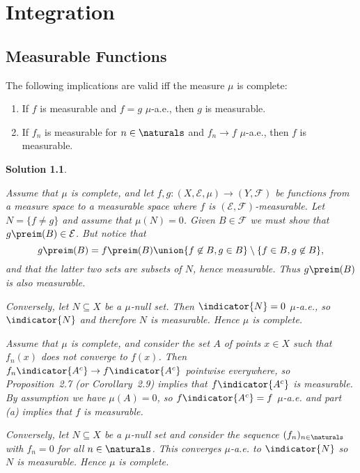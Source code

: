 \documentclass[article, a4paper, 11pt, oneside]{memoir}
\numberwithin{equation}{chapter}
\newcommand{\calE}{\mathcal{E}}
\newcommand{\calF}{\mathcal{F}}
\theoremstyle{nonumberplain}
\newtheorem{solution}{Solution}
\begin{document}
\chapter{Integration}

\section{Measurable Functions}

\begin{exerciseframed*}[10]
    The following implications are valid iff the measure $\mu$ is complete:
    \begin{enumerate}
        \item If $f$ is measurable and $f = g$ $\mu$-a.e., then $g$ is measurable.
        \item If $f_n$ is measurable for $n \in \naturals$ and $f_n \to f$ $\mu$-a.e., then $f$ is measurable.
    \end{enumerate}
\end{exerciseframed*}

\begin{solution}
\begin{solutionsec}
    \item Assume that $\mu$ is complete, and let $f,g \colon (X,\calE,\mu) \to (Y,\calF)$ be functions from a measure space to a measurable space where $f$ is $(\calE,\calF)$-measurable. Let $N = \{f \neq g\}$ and assume that $\mu(N) = 0$. Given $B \in \calF$ we must show that $g\preim(B) \in \calE$. But notice that
    \begin{equation*}
        g\preim(B)
            = f\preim(B) \union \{ f \not\in B, g \in B \} \setminus \{ f \in B, g \not\in B \},
    \end{equation*}
    and that the latter two sets are subsets of $N$, hence measurable. Thus $g\preim(B)$ is also measurable.


	Conversely, let $N \subseteq X$ be a $\mu$-null set. Then $\indicator{N} = 0$ $\mu$-a.e., so $\indicator{N}$ and therefore $N$ is measurable. Hence $\mu$ is complete.

    \item Assume that $\mu$ is complete, and consider the set $A$ of points $x \in X$ such that $f_n(x)$ does not converge to $f(x)$. Then $f_n \indicator{A^c} \to f \indicator{A^c}$ pointwise everywhere, so Proposition~2.7 (or Corollary~2.9) implies that $f \indicator{A^c}$ is measurable. By assumption we have $\mu(A) = 0$, so $f \indicator{A^c} = f$ $\mu$-a.e. and part (a) implies that $f$ is measurable.
    
    Conversely, let $N \subseteq X$ be a $\mu$-null set and consider the sequence $(f_n)_{n\in\naturals}$ with $f_n = 0$ for all $n \in \naturals$. This converges $\mu$-a.e. to $\indicator{N}$ so $N$ is measurable. Hence $\mu$ is complete.
\end{solutionsec}
\end{solution}
\end{document}
